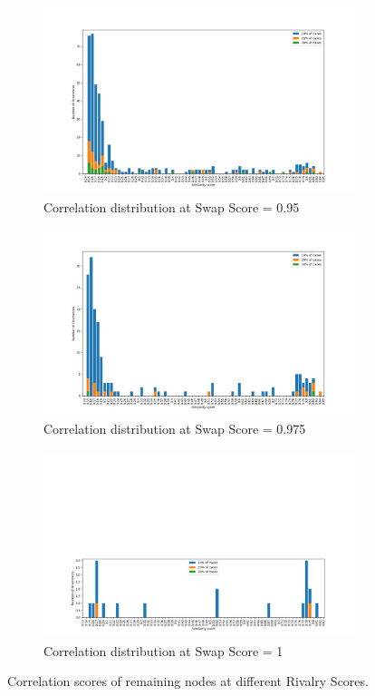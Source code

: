 \begin{figure}[!htb]
	\centering
	\begin{subfigure}[b]{0.50\linewidth}
		\includegraphics[width=\linewidth]{Minor Thesis/figures/graphs/hist/Hist95.png}
		\caption{Correlation distribution at Swap Score = 0.95}
	\end{subfigure}
	\hfill
	\begin{subfigure}[b]{0.50\linewidth}
		\includegraphics[width=\linewidth]{Minor Thesis/figures/graphs/hist/Hist975.png}
		\caption{Correlation distribution at Swap Score = 0.975}
	\end{subfigure}
	\hfill
	\begin{subfigure}[b]{0.50\linewidth}
		\includegraphics[width=\linewidth]{Minor Thesis/figures/graphs/hist/Hist1.png}
		\caption{Correlation distribution at Swap Score = 1}
	\end{subfigure}	
	\caption{Correlation scores of remaining nodes at different Rivalry Scores.}
	\label{fig:triade-hist}
\end{figure}

